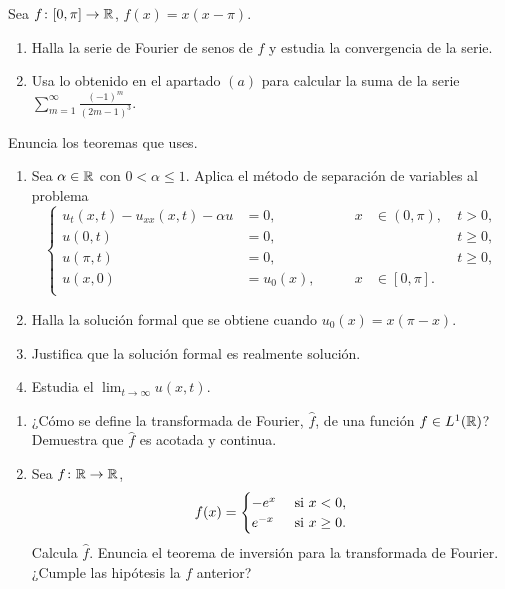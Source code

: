 \documentclass[a4paper, 12pt, extrafontsizes]{memoir}
\begin{document}
\begin{exercise}
Sea $f \colon [0,\pi] \to \mathbb R$, $f(x) = x(x-\pi)$.
\begin{enumerate}
    \item Halla la serie de Fourier de senos de $f$ y estudia la convergencia de la serie.
    \item Usa lo obtenido en el apartado $(a)$ para calcular la suma de la serie $\sum_{m=1}^\infty \frac{(-1)^m}{(2m-1)^3}$.
\end{enumerate}
Enuncia los teoremas que uses.
\end{exercise}

\begin{exercise}
\hfill
\begin{enumerate}
    \item Sea $\alpha \in \mathbb R$ con $0 < \alpha \leq 1$. Aplica el método de separación de variables al problema
    \[\left\{\begin{alignedat}{4}
    u_{t}(x,t)-u_{xx}(x,t) -\alpha u &= 0, \qquad & x &\in (0,\pi), \ & t > 0, \\
    u(0,t) &= 0, \qquad & & & t \geq 0, \\
    u(\pi,t) &= 0, \qquad & & & t \geq 0, \\
    u(x,0) &= u_0(x), \qquad & x &\in [0,\pi]. \\
    \end{alignedat}\right.\]
    \item Halla la solución formal que se obtiene cuando $u_0(x) = x(\pi-x)$.
    \item Justifica que la solución formal es realmente solución.
    \item Estudia el $\lim_{t \to \infty} u(x,t)$.
\end{enumerate}
\end{exercise}

\begin{exercise}
\hfill
\begin{enumerate}
    \item ¿Cómo se define la transformada de Fourier, $\widehat{f}$, de una función $f \in L^1(\mathbb R)$? Demuestra que $\widehat{f}$ es acotada y continua.
    \item Sea $f \colon \mathbb R \to \mathbb R$,
    \[f(x) = \begin{cases}
        -e^x & $ si $ x < 0, \\
        e^{-x} & $ si $ x \geq 0.
    \end{cases}\]
    Calcula $\widehat{f}$. Enuncia el teorema de inversión para la transformada de Fourier. ¿Cumple las hipótesis la $f$ anterior?
\end{enumerate}
\end{exercise}
\end{document}
